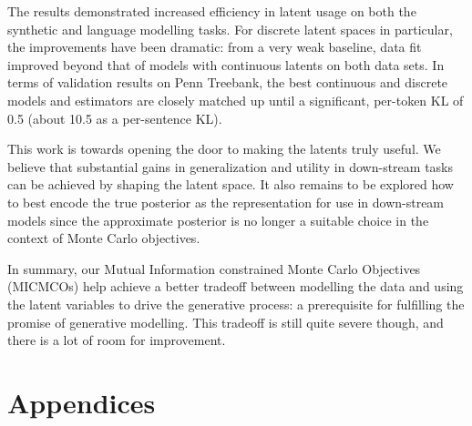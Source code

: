 The results demonstrated increased efficiency in latent usage on both the synthetic and language modelling tasks.
For discrete latent spaces in particular, the improvements have been dramatic: from a very weak baseline, data fit improved beyond that of models with continuous latents on both data sets.
In terms of validation results on Penn Treebank, the best continuous and discrete models and estimators are closely matched up until a significant, per-token KL of 0.5 (about 10.5 as a per-sentence KL).

This work is towards opening the door to making the latents truly useful.
We believe that substantial gains in generalization and utility in down-stream tasks can be achieved by shaping the latent space.
It also remains to be explored how to best encode the true posterior as the representation for use in down-stream models since the approximate posterior is no longer a suitable choice in the context of Monte Carlo objectives.

In summary, our Mutual Information constrained Monte Carlo Objectives (MICMCOs) help achieve a better tradeoff between modelling the data and using the latent variables to drive the generative process: a prerequisite for fulfilling the promise of generative modelling.
This tradeoff is still quite severe though, and there is a lot of room for improvement.

\mglsep

\clearpage

\chapter*{Appendices}


